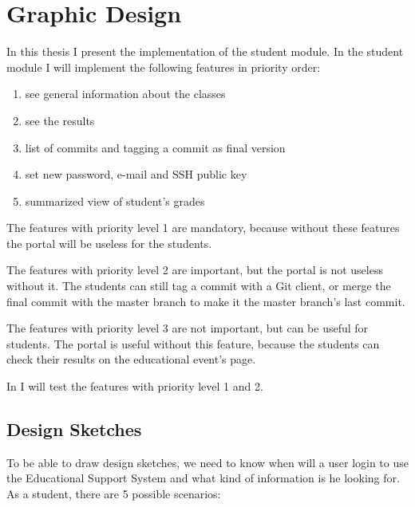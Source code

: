\chapter{Graphic Design}

In this thesis I present the implementation of the student module. In the student module I will implement the following features in priority order:
\begin{enumerate}
	\item see general information about the classes
	\setcounter{enumi}{0}
	\item see the results
	\item list of commits and tagging a commit as final version
	\setcounter{enumi}{1}
	\item set new password, e-mail and SSH public key
	\item summarized view of student's grades
\end{enumerate}

The features with priority level 1 are mandatory, because without these features the portal will be useless for the students.

The features with priority level 2 are important, but the portal is not useless without it. The students can still tag a commit with a Git client, or merge the final commit with the master branch to make it the master branch's last commit. 

The features with priority level 3 are not important, but can be useful for students. The portal is useful without this feature, because the students can check their results on the educational event's page.

In  I will test the features with priority level 1 and 2.


\section{Design Sketches}
To be able to draw design sketches, we need to know when will a user login to use the Educational Support System and what kind of information is he looking for. As a student, there are 5 possible scenarios:

